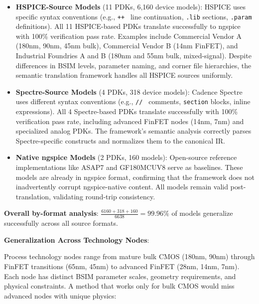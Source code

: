 \documentclass[conference]{IEEEtran}
\begin{document}
\begin{itemize}
\item \textbf{HSPICE-Source Models} (11 PDKs, 6,160 device models): HSPICE uses specific syntax conventions (e.g., \texttt{++ } line continuation, \texttt{.lib} sections, \texttt{.param} definitions). All 11 HSPICE-based PDKs translate successfully to ngspice with 100\% verification pass rate. Examples include Commercial Vendor A (180nm, 90nm, 45nm bulk), Commercial Vendor B (14nm FinFET), and Industrial Foundries A and B (180nm and 55nm bulk, mixed-signal). Despite differences in BSIM levels, parameter naming, and corner file hierarchies, the semantic translation framework handles all HSPICE sources uniformly.

\item \textbf{Spectre-Source Models} (4 PDKs, 318 device models): Cadence Spectre uses different syntax conventions (e.g., \texttt{// } comments, \texttt{section} blocks, inline expressions). All 4 Spectre-based PDKs translate successfully with 100\% verification pass rate, including advanced FinFET nodes (14nm, 7nm) and specialized analog PDKs. The framework's semantic analysis correctly parses Spectre-specific constructs and normalizes them to the canonical IR.

\item \textbf{Native ngspice Models} (2 PDKs, 160 models): Open-source reference implementations like ASAP7 and GF180MCUV8 serve as baselines. These models are already in ngspice format, confirming that the framework does not inadvertently corrupt ngspice-native content. All models remain valid post-translation, validating round-trip consistency.
\end{itemize}

\textbf{Overall by-format analysis}: $\frac{6160 + 318 + 160}{6638} = 99.96\%$ of models generalize successfully across all source formats.

\textbf{Generalization Across Technology Nodes}:

Process technology nodes range from mature bulk CMOS (180nm, 90nm) through FinFET transitions (65nm, 45nm) to advanced FinFET (28nm, 14nm, 7nm). Each node has distinct BSIM parameter scales, geometry requirements, and physical constraints. A method that works only for bulk CMOS would miss advanced nodes with unique physics:
\end{document}
